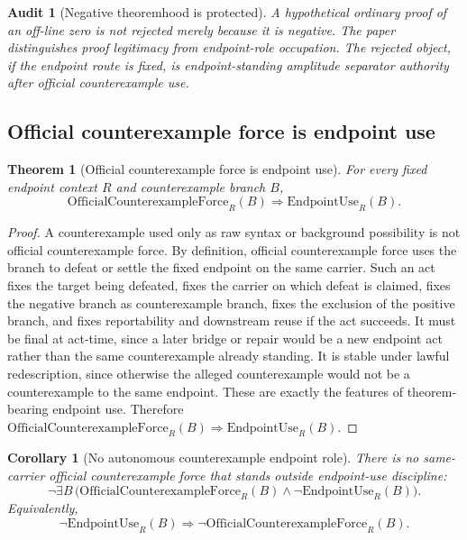 \documentclass[11pt]{article}
\newtheorem{theorem}{Theorem}[section]
\newtheorem{corollary}{Corollary}[section]
\newtheorem{audit}{Audit}[section]
\newcommand{\EndpointUse}{\mathrm{EndpointUse}}
\newcommand{\OfficialCxForce}{\mathrm{OfficialCounterexampleForce}}
\begin{document}
\begin{audit}[Negative theoremhood is protected]
A hypothetical ordinary proof of an off-line zero is not rejected merely because it is negative. The paper distinguishes proof legitimacy from endpoint-role occupation. The rejected object, if the endpoint route is fixed, is endpoint-standing amplitude separator authority after official counterexample use.
\end{audit}

\subsection{Official counterexample force is endpoint use}

\begin{theorem}[Official counterexample force is endpoint use]\label{thm:official-counterexample-force-endpoint-use}
For every fixed endpoint context \(R\) and counterexample branch \(B\),
\[
\OfficialCxForce_R(B)\Rightarrow \EndpointUse_R(B).
\]
\end{theorem}

\begin{proof}
A counterexample used only as raw syntax or background possibility is not official counterexample force. By definition, official counterexample force uses the branch to defeat or settle the fixed endpoint on the same carrier. Such an act fixes the target being defeated, fixes the carrier on which defeat is claimed, fixes the negative branch as counterexample branch, fixes the exclusion of the positive branch, and fixes reportability and downstream reuse if the act succeeds. It must be final at act-time, since a later bridge or repair would be a new endpoint act rather than the same counterexample already standing. It is stable under lawful redescription, since otherwise the alleged counterexample would not be a counterexample to the same endpoint. These are exactly the features of theorem-bearing endpoint use. Therefore \(\OfficialCxForce_R(B)\Rightarrow\EndpointUse_R(B)\).
\end{proof}


\begin{corollary}[No autonomous counterexample endpoint role]\label{cor:no-autonomous-counterexample-endpoint-role}
There is no same-carrier official counterexample force that stands outside endpoint-use discipline:
\[
\neg\exists B\,\bigl(\OfficialCxForce_R(B)\wedge \neg\EndpointUse_R(B)\bigr).
\]
Equivalently,
\[
\neg\EndpointUse_R(B)\Rightarrow \neg\OfficialCxForce_R(B).
\]
\end{corollary}
\end{document}
